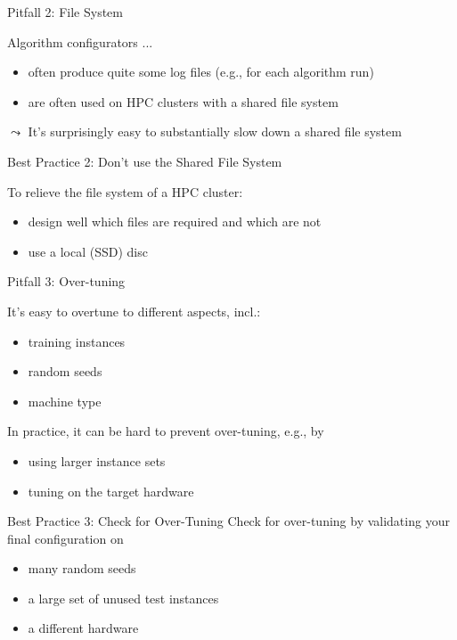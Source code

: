 \begin{frame}[c]{Pitfall 2: File System}

Algorithm configurators ...
\begin{itemize}
	\item often produce quite some log files (e.g., for each algorithm run)
	\item  are often used on HPC clusters with a shared file system
\end{itemize}

\pause
$\leadsto$ It's surprisingly easy to substantially slow down a shared file system

\pause
\bigskip

\begin{block}{Best Practice 2: Don't use the Shared File System}

To relieve the file system of a HPC cluster:
\begin{itemize}
	\item design well which files are required and which are not
	\item use a local (SSD) disc
\end{itemize}
	
\end{block}

\end{frame}
\begin{frame}[c]{Pitfall 3: Over-tuning}

It's easy to overtune to different aspects, incl.:

\begin{itemize}
	\item training instances
	\item random seeds
	\item machine type
\end{itemize}

\bigskip
\pause

In practice, it can be hard to prevent over-tuning, e.g., by

\begin{itemize}
	\item using larger instance sets
	\item tuning on the target hardware
\end{itemize}

\begin{block}{Best Practice 3: Check for Over-Tuning}
Check for over-tuning by validating your final configuration on
\begin{itemize}
	\item many random seeds
	\item a large set of unused test instances
	\item a different hardware
\end{itemize}
\end{block}
	
\end{frame}

